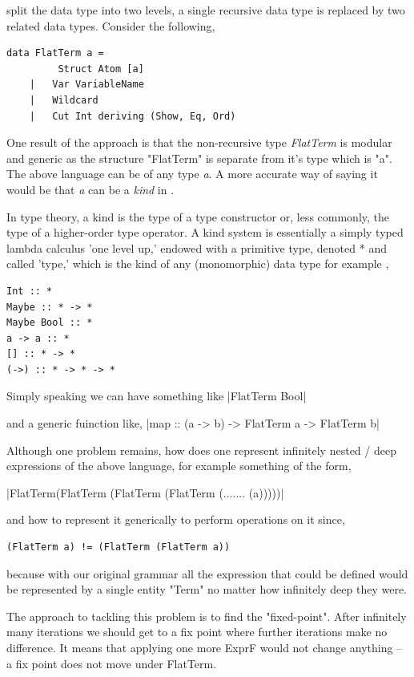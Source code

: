 \documentclass[thesis-solanki.tex]{subfiles}
\begin{document}
split the data type into two levels, a single recursive data type is replaced by two related data types. Consider the following,
\begin{verbatim}
data FlatTerm a = 
		 Struct Atom [a]
	|	Var VariableName
	|	Wildcard
	|	Cut Int deriving (Show, Eq, Ord)
\end{verbatim}

One result of the approach is that the non-recursive type \textit{FlatTerm} is modular and generic as the structure "FlatTerm" is separate 
from it's type which is "a". 
The above language can be of any type \textit{a}. A more accurate way of saying it would be that \textit{a} can be a \textit{kind} in 
. 

In type theory, a kind is the type of a type constructor or, less commonly, the type of a higher-order type operator. A kind system is 
essentially a simply typed lambda calculus 'one level up,' endowed with a primitive type, denoted * and called 'type,' which is the kind of 
any (monomorphic) data type for example \cite{website:kindhaskellwiki},

\begin{verbatim}
Int :: *
Maybe :: * -> *
Maybe Bool :: *
a -> a :: *
[] :: * -> *
(->) :: * -> * -> *
\end{verbatim}  

Simply speaking we can have something like 
|FlatTerm Bool|

and a generic fuinction like,
|map :: (a -> b) -> FlatTerm a -> FlatTerm b|


Although one problem remains, how does one represent infinitely nested / deep expressions of the above language, for example something of
the form,

|FlatTerm(FlatTerm (FlatTerm (FlatTerm (....... (a)))))|

and how to represent it generically to perform operations on it since,
\begin{verbatim}
(FlatTerm a) != (FlatTerm (FlatTerm a))
\end{verbatim}

because with our original grammar all the expression that could be defined would be represented by a single entity "Term" no matter how 
infinitely deep they were.

The approach to tackling this problem is to find the "fixed-point". After infinitely many iterations we should get to a fix point where
further iterations make no difference. It means that applying one more ExprF would not change anything – a fix point does not move under 
FlatTerm. 
\end{document}
